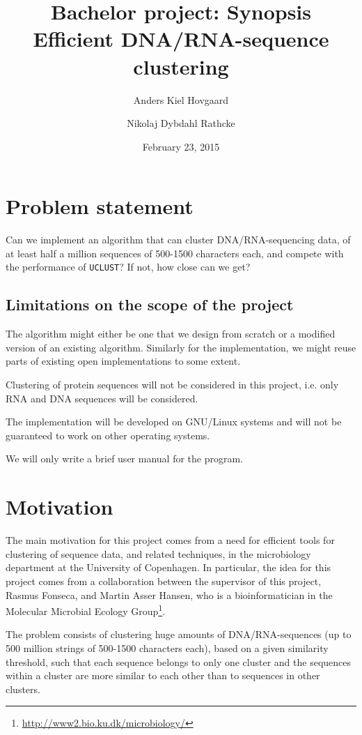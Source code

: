 \documentclass[11pt,a4paper]{article}
\title{Bachelor project: Synopsis \\
       \vspace{2mm}
       {\LARGE Efficient DNA/RNA-sequence clustering}}
\author{Anders Kiel Hovgaard \and Nikolaj Dybdahl Rathcke}
\date{February 23, 2015}
\begin{document}
\maketitle
\thispagestyle{fancy}

\section{Problem statement}
Can we implement an algorithm that can cluster DNA/RNA-sequencing data, of at
least half a million sequences of 500-1500 characters each, and compete with
the performance of \texttt{UCLUST}? If not, how close can we get?


\subsection{Limitations on the scope of the project}
The algorithm might either be one that we design from scratch or a modified
version of an existing algorithm. Similarly for the implementation, we might
reuse parts of existing open implementations to some extent.

Clustering of protein sequences will not be considered in this project,
i.e. only RNA and DNA sequences will be considered.

The implementation will be developed on GNU/Linux systems and will not be
guaranteed to work on other operating systems.

We will only write a brief user manual for the program.


\section{Motivation}
The main motivation for this project comes from a need for efficient tools for
clustering of sequence data, and related techniques, in the microbiology
department at the University of Copenhagen. In particular, the idea for this
project comes from a collaboration between the supervisor of this project,
Rasmus Fonseca, and Martin Asser Hansen, who is a bioinformatician in the
Molecular Microbial Ecology
Group\footnote{\url{http://www2.bio.ku.dk/microbiology/}}.

The problem consists of clustering huge amounts of DNA/RNA-sequences (up to 500
million strings of 500-1500 characters each), based on a given similarity
threshold, such that each sequence belongs to only one cluster and the
sequences within a cluster are more similar to each other than to sequences in
other clusters.
 
\end{document}
